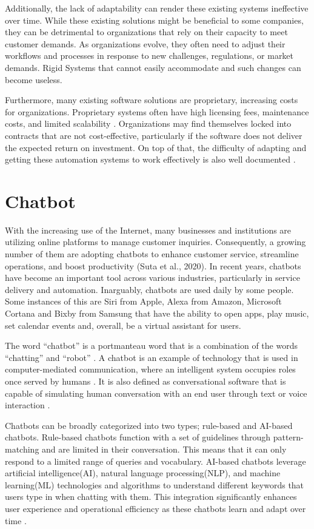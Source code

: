 Additionally, the lack of adaptability can render these existing systems ineffective over time. While these existing solutions might be beneficial to some companies, they can be detrimental to organizations that rely on their capacity to meet customer demands\cite{akkermans2003}. As organizations evolve, they often need to adjust their workflows and processes in response to new challenges, regulations, or market demands. Rigid Systems that cannot easily accommodate and such changes can become useless.

Furthermore, many existing software solutions are proprietary, increasing costs for organizations. Proprietary systems often have high licensing fees, maintenance costs, and limited scalability \cite{goel2012, prasad2013}. Organizations may find themselves locked into contracts that are not cost-effective, particularly if the software does not deliver the expected return on investment. On top of that, the difficulty of adapting and getting these automation systems to work effectively is also well documented \cite{adams2011, sarker2003, scott2000}.

\section{Chatbot}

With the increasing use of the Internet, many businesses and institutions are utilizing online platforms to manage customer inquiries. Consequently, a growing number of them are adopting chatbots to enhance customer service, streamline operations, and boost productivity (Suta et al., 2020). In recent years, chatbots have become an important tool across various industries, particularly in service delivery and automation. Inarguably, chatbots are used daily by some people. Some instances of this are Siri from Apple, Alexa from Amazon, Microsoft Cortana and Bixby from Samsung that have the ability to open apps, play music, set calendar events and, overall, be a virtual assistant for users.

The word “chatbot” is a portmanteau word that is a combination of the words “chatting” and “robot” \cite{rese2020}. A chatbot is an example of technology that is used in computer-mediated communication, where an intelligent system occupies roles once served by humans \cite{beattie2020}. It is also defined as conversational software that is capable of simulating human conversation with an end user through text or voice interaction \cite{Naruzzaman2018}.

Chatbots can be broadly categorized into two types; rule-based and AI-based chatbots. Rule-based chatbots function with a set of guidelines through pattern-matching and are limited in their conversation. This means that it can only respond to a limited range of queries and vocabulary. AI-based chatbots leverage artificial intelligence(AI), natural language processing(NLP), and machine learning(ML) technologies and algorithms to understand different keywords that users type in when chatting with them. This integration significantly enhances user experience and operational efficiency as these chatbots learn and adapt over time \cite{Kar2016}.

